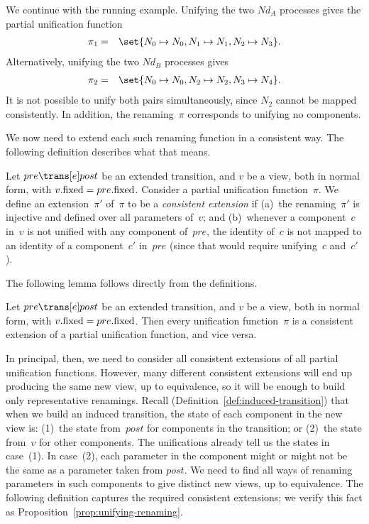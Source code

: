 
\begin{example}
We continue with the running example.  Unifying the two $Nd_A$ processes
gives the partial unification function
%
\begin{eqnarray*}
\pi_1 & = & \set{N_0 \mapsto N_0, N_1 \mapsto N_1, N_2 \mapsto N_3}.
\end{eqnarray*}
%
Alternatively, unifying the two $Nd_B$ processes gives
\begin{eqnarray*}
\pi_2 & = & \set{N_0 \mapsto N_0, N_2 \mapsto N_2, N_3 \mapsto N_4}.
\end{eqnarray*}
It is not possible to unify both pairs simultaneously, since $N_2$ cannot be
mapped consistently.  In addition, the renaming~$\pi$ corresponds to unifying
no components.
\end{example}

We now need to extend each such renaming function in a consistent way.  The
following definition describes what that means.
%
\begin{definition}
\label{def:consistent-extension}
Let $pre \trans[e] post$ be an extended transition, and $v$ be a view, both in
normal form, with $v.\mathrm{fixed} = pre.\mathrm{fixed}$.
%
Consider a partial unification function~$\pi$.  We define an extension~$\pi'$
of~$\pi$ to be a \emph{consistent extension} if (a)~the renaming~$\pi'$ is
injective and defined over all parameters of~$v$; and (b)~whenever a
component~$c$ in~$v$ is not unified with any component of~$pre$, the identity
of~$c$ is not mapped to an identity of a component~$c'$ in~$pre$ (since that
would require unifying~$c$ and~$c'$).
\end{definition}


The following lemma follows directly from the definitions.
%
\begin{lemma}
Let $pre \trans[e] post$ be an extended transition, and $v$ be a view, both in
normal form, with $v.\mathrm{fixed} = pre.\mathrm{fixed}$.  Then every unification
function~$\pi$ is a consistent extension of a partial unification function,
and vice versa.
\end{lemma}

In principal, then, we need to consider all consistent extensions of all
partial unification functions.  However, many different consistent extensions
will end up producing the same new view, up to equivalence, so it will be
enough to build only representative renamings.  Recall
(Definition~\ref{def:induced-transition}) that when we build an induced
transition, the state of each component in the new view is: (1)~the state
from~$post$ for components in the transition; or (2)~the state from~$v$ for
other components.  The unifications already tell us the states in case~(1).
In case~(2), each parameter in the component might or might not be the same as
a parameter taken from $post$.  We need to find all ways of renaming
parameters in such components to give distinct new views, up to equivalence.
The following definition captures the required consistent extensions; we
verify this fact as Proposition~\ref{prop:unifying-renaming}.

